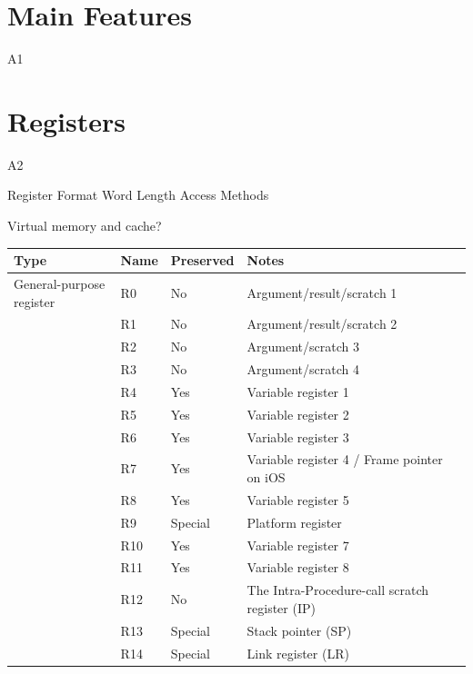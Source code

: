 \documentclass[oneside,a4paper]{article}
\begin{document}
\section{Main Features}
A1

\section{Registers}
A2

Register Format
Word Length
Access Methods

Virtual memory and cache?


\begin{table}[htbp]
	\centering
	\begin{tabular}{lllllll}
		\toprule
		Type						&	\multicolumn{3}{l}{Name}	&	Preserved	&	Notes						\\
		\midrule
	 	General-purpose register	&	\multicolumn{3}{l}{R0}		&	No			&	Argument/result/scratch 1   \\
							 		&	\multicolumn{3}{l}{R1}		&	No			&	Argument/result/scratch 2   \\
							 		&	\multicolumn{3}{l}{R2}		&	No			&	Argument/scratch 3			\\
							 		&	\multicolumn{3}{l}{R3}		&	No			&	Argument/scratch 4			\\
							 		&	\multicolumn{3}{l}{R4}		&	Yes			&	Variable register 1			\\
							 		&	\multicolumn{3}{l}{R5}		&	Yes			&	Variable register 2			\\
							 		&	\multicolumn{3}{l}{R6}		&	Yes			&	Variable register 3			\\
							 		&	\multicolumn{3}{l}{R7}		&	Yes			&	Variable register 4 / Frame pointer on iOS	\\
							 		&	\multicolumn{3}{l}{R8}		&	Yes			&	Variable register 5			\\
							 		&	\multicolumn{3}{l}{R9}		&	Special		&	Platform register			\\
							 		&	\multicolumn{3}{l}{R10}		&	Yes			&	Variable register 7			\\
							 		&	\multicolumn{3}{l}{R11}		&	Yes			&	Variable register 8			\\
							 		&	\multicolumn{3}{l}{R12}		&	No			&	The Intra-Procedure-call scratch register (IP)	\\
							 		&	\multicolumn{3}{l}{R13}		&	Special		&	Stack pointer (SP)	 		\\
							 		&	\multicolumn{3}{l}{R14}		&	Special		&	Link register (LR)	 		\\

\end{tabular}
\end{table}
\end{document}
